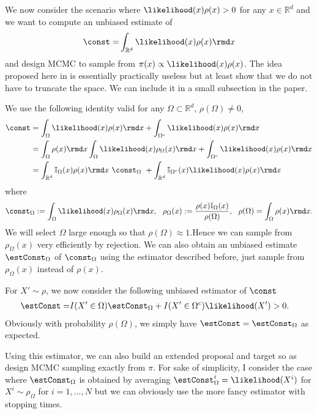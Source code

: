 
We now consider the scenario where $\likelihood(x)\rho(x)>0$ for any $x\in\mathbb{R}^{d}$
and we want to compute an unbiased estimate of
\begin{align*}
\const= & \int_{\mathbb{R}^{d}}\likelihood(x)\rho(x)\rmd x\\
\end{align*}
and design MCMC to sample from $\pi(x)\propto \likelihood(x)\rho(x)$. The idea proposed here in is essentially practically useless but at least show that we do not have to truncate the space. We can include it in a small subsection in the paper.


We use the following identity valid for any $\Omega\subset\mathbb{R}^{d}$, $\rho(\Omega)\neq 0$,
\begin{align*}
\const & =\int_{\Omega}\likelihood(x)\rho(x)\rmd x+\int_{\Omega^{c}}\likelihood(x)\rho(x)\rmd x\\
 & =\int_{\Omega}\rho(x)\rmd x\int_{\Omega}\likelihood(x)\rho_{\Omega}(x)\rmd x+\int_{\Omega^{c}}\likelihood(x)\rho(x) \rmd x\\
 & =\int_{\mathbb{R}^{d}}\mathbb{I}_{\Omega}(x)\rho(x)\rmd x~\const_{\Omega}~+\int_{\mathbb{R}^{d}}\mathbb{I}_{\Omega^{c}}(x) \likelihood(x)\rho(x)\rmd x
\end{align*}
where
\[
\const_{\Omega}:=\int_{\Omega}\likelihood(x)\rho_{\Omega}(x)\rmd x,~~\rho_{\Omega}(x):=\frac{\rho(x)\mathbb{I}_{\Omega}(x)}{\rho(\Omega)},~~\rho(\Omega)=\int_{\Omega}\rho(x)\rmd x.
\]
We will select $\Omega$ large enough so that $\rho(\Omega)\approx1.$Hence
we can sample from $\rho_{\Omega}(x)$ very efficiently by rejection.
We can also obtain an unbiased estimate $\estConst_{\Omega}$ of
$\const_{\Omega}$ using the estimator described before, just sample from $\rho_{\Omega}(x)$ instead of $\rho(x)$.

For $X'\sim\rho$, we now consider the following unbiased estimator of
$\const$
\begin{align*}
\estConst= & I(X'\in\Omega)\estConst_{\Omega}+I(X'\in\Omega^{c})\likelihood(X')>0.
\end{align*}
Obviously with probability $\rho(\Omega)$, we simply have $\estConst=\estConst_{\Omega}$
as expected.

Using this estimator, we can also build an extended proposal and target
so as design MCMC sampling exactly from $\pi$. For sake of simplicity,
I consider the case where $\estConst_{\Omega}$ is obtained by averaging
$\estConst_{\Omega}^{i}=\likelihood(X^{i})$ for $X^{i}\sim\rho_{\Omega}$
for $i=1,...,N$ but we can obviously use the more fancy estimator
with stopping times.

